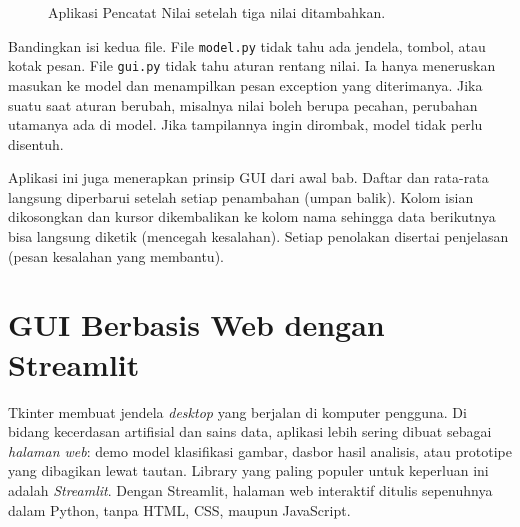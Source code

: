 \begin{figure}[htbp]
\centering
{}
\caption{Aplikasi Pencatat Nilai setelah tiga nilai ditambahkan.}
\end{figure}

Bandingkan isi kedua file. File \texttt{model.py} tidak tahu ada jendela, tombol, atau kotak pesan. File \texttt{gui.py} tidak tahu aturan rentang nilai. Ia hanya meneruskan masukan ke model dan menampilkan pesan exception yang diterimanya. Jika suatu saat aturan berubah, misalnya nilai boleh berupa pecahan, perubahan utamanya ada di model. Jika tampilannya ingin dirombak, model tidak perlu disentuh.

Aplikasi ini juga menerapkan prinsip GUI dari awal bab. Daftar dan rata-rata langsung diperbarui setelah setiap penambahan (umpan balik). Kolom isian dikosongkan dan kursor dikembalikan ke kolom nama sehingga data berikutnya bisa langsung diketik (mencegah kesalahan). Setiap penolakan disertai penjelasan (pesan kesalahan yang membantu).

\section{GUI Berbasis Web dengan Streamlit}

Tkinter membuat jendela \emph{desktop} yang berjalan di komputer pengguna. Di bidang kecerdasan artifisial dan sains data, aplikasi lebih sering dibuat sebagai \emph{halaman web}: demo model klasifikasi gambar, dasbor hasil analisis, atau prototipe yang dibagikan lewat tautan. Library yang paling populer untuk keperluan ini adalah \emph{Streamlit}. Dengan Streamlit, halaman web interaktif ditulis sepenuhnya dalam Python, tanpa HTML, CSS, maupun JavaScript.

